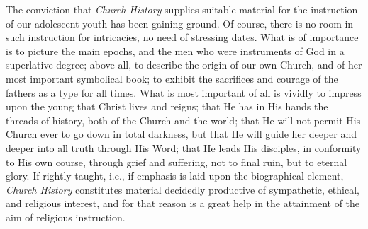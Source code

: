 The conviction that \emph{Church History} supplies suitable material for the instruction of our adolescent youth has been gaining ground. Of course, there is no room in such instruction for intricacies, no need of stressing dates. What is of importance is to picture the main epochs, and the men who were instruments of God in a superlative degree; above all, to describe the origin of our own Church, and of her most important symbolical book; to exhibit the sacrifices and courage of the fathers as a type for all times. What is most important of all is vividly to impress upon the young that Christ lives and reigns; that He has in His hands the threads of history, both of the Church and the world; that He will not permit His Church ever to go down in total darkness, but that He will guide her deeper and deeper into all truth through His Word; that He leads His disciples, in conformity to His own course, through grief and suffering, not to final ruin, but to eternal glory. If rightly taught, i.e., if emphasis is laid upon the biographical element, \emph{Church History} constitutes material decidedly productive of sympathetic, ethical, and religious interest, and for that reason is a great help in the attainment of the aim of religious instruction.

